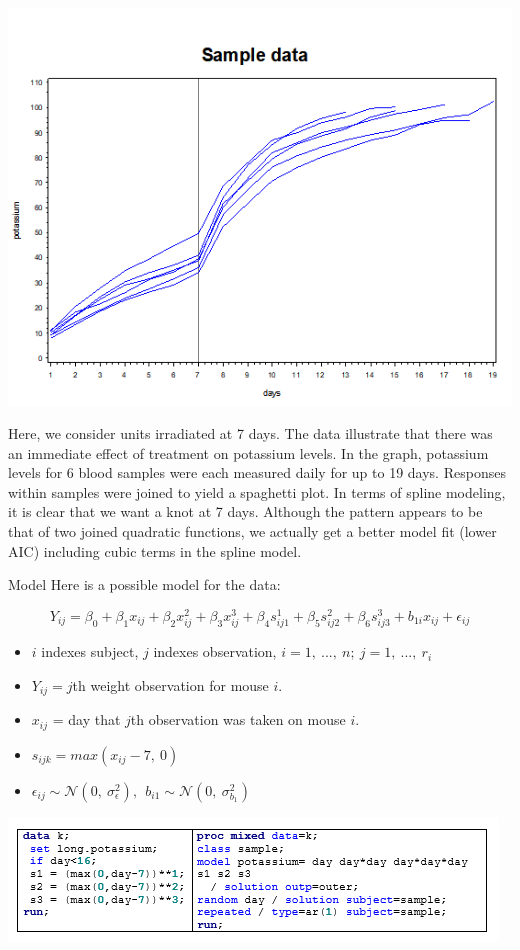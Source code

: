 \documentclass[
  9pt,
  ignorenonframetext,
]{beamer}
\providecommand{\tightlist}{%
  \setlength{\itemsep}{0pt}\setlength{\parskip}{0pt}}
\begin{document}
\begin{frame}{}
\protect\hypertarget{section-5}{}
\begin{center}\includegraphics[width=0.7\linewidth]{figs_L12/f6} \end{center}

Here, we consider units irradiated at 7 days. The data illustrate that
there was an immediate effect of treatment on potassium levels. In the
graph, potassium levels for 6 blood samples were each measured daily for
up to 19 days. Responses within samples were joined to yield a spaghetti
plot. In terms of spline modeling, it is clear that we want a knot at 7
days. Although the pattern appears to be that of two joined quadratic
functions, we actually get a better model fit (lower AIC) including
cubic terms in the spline model.
\end{frame}

\begin{frame}{Model}
\protect\hypertarget{model}{}
Here is a possible model for the data:

\[Y_{ij}=\beta_0+\beta_1 x_{ij}+\beta_2 x_{ij}^2+\beta_3 x_{ij}^3+\beta_4 s_{ij1}^1+\beta_5 s_{ij2}^2+\beta_6 s_{ij3}^3+b_{1i} x_{ij}+\epsilon_{ij}\]

\begin{itemize}
\tightlist
\item
  \(i\) indexes subject, \(j\) indexes observation,
  \(i=1,\ ...,\ n;\ j=1,\ ...,\ r_i\)
\item
  \(Y_{ij} = j\)th weight observation for mouse \(i\).
\item
  \(x_{ij}\) = day that \(j\)th observation was taken on mouse \(i\).
\item
  \(s_{ijk} = max(x_{ij} - 7,\ 0)\)
\item
  \(\epsilon_{ij}\sim \mathcal N(0,\  \sigma_\epsilon^2),\ \ b_{i1}\sim \mathcal N(0,\  \sigma_{b_1}^2)\)
\end{itemize}

\begin{center}\includegraphics[width=0.7\linewidth]{figs_L12/f7} \end{center}
\end{frame}
\end{document}
